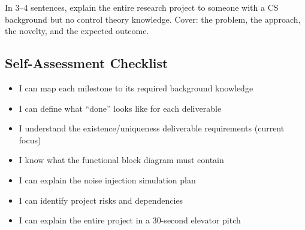 In 3--4 sentences, explain the entire research project to someone with a CS background but no control theory knowledge. Cover: the problem, the approach, the novelty, and the expected outcome.

\begin{largeanswer}\end{largeanswer}

\subsection*{Self-Assessment Checklist}

\begin{itemize}[leftmargin=2em, label=$\square$]
  \item I can map each milestone to its required background knowledge
  \item I can define what ``done'' looks like for each deliverable
  \item I understand the existence/uniqueness deliverable requirements (current focus)
  \item I know what the functional block diagram must contain
  \item I can explain the noise injection simulation plan
  \item I can identify project risks and dependencies
  \item I can explain the entire project in a 30-second elevator pitch
\end{itemize}

\begin{notesbox}\end{notesbox}
